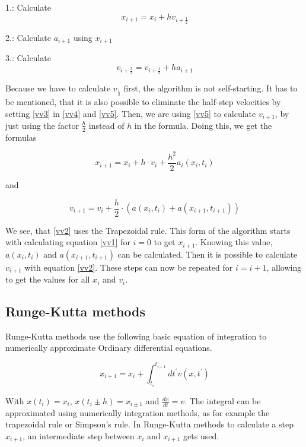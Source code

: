 \documentclass[10pt,a4paper]{article}
\begin{document}
1.: Calculate
\begin{equation}
	\label{vv4}
	x_{i+1} = x_i +h v_{i+ \frac{1}{2}}
\end{equation}

2.: Calculate $a_{i+1}$ using $x_{i+1}$

3.: Calculate
\begin{equation}
	\label{vv5}
v_{i+\frac{3}{2}} = v_{i+\frac{1}{2}} +h a_{i+1}
\end{equation}

Because we have to calculate $v_\frac{1}{2}$ first, the algorithm is not self-starting. It has to be mentioned, that it is also possible to eliminate the half-step velocities by setting \eqref{vv3} in \eqref{vv4} and \eqref{vv5}. Then, we are using \eqref{vv5} to calculate $v_{i+1}$, by just using the factor $\frac{h}{2}$ instead of $h$ in the formula.
Doing this, we get the formulas

\begin{equation}
\label{vv1}
x_{i+1} = x_i + h \cdot v_i + \frac{h^2}{2}  a_i(x_i, t_i)
\end{equation}

and

\begin{equation}
\label{vv2}
v_{i+1} = v_i + \frac{h}{2} \cdot (a(x_i, t_i) + a(x_{i+1}, t_{i+1}))
\end{equation}

We see, that \eqref{vv2} uses the Trapezoidal rule.
This form of the algorithm starts with calculating equation \eqref{vv1} for $i = 0$ to get $x_{i+1}$. Knowing this value, $a(x_i, t_i)$ and $a(x_{i+1}, t_{i+1})$ can be calculated. Then it is possible to calculate $v_{i+1}$ with equation \eqref{vv2}. These steps can now be repeated for $i = i+1$, allowing to get the values for all $x_i$ and $v_i$.

\subsection{Runge-Kutta methods}

Runge-Kutta methods use the following basic equation of integration to numerically approximate Ordinary differential equations.

\begin{equation}
\label{rc1}
x_{i+1} = x_i + \int_{t_i}^{t_{i+1}} dt^{'} v(x, t^{'})
\end{equation}

With $x(t_i) = x_i$, $x(t_i \pm h) = x_{i \pm 1}$ and $\frac{dx}{dt} = v$. The integral can be approximated using numerically integration methods, as for example the trapezoidal rule or Simpson's rule. In Runge-Kutta methods to calculate a step $x_{i+1}$, an intermediate step between $x_i$ and $x_{i+1}$ gets used.
\end{document}
